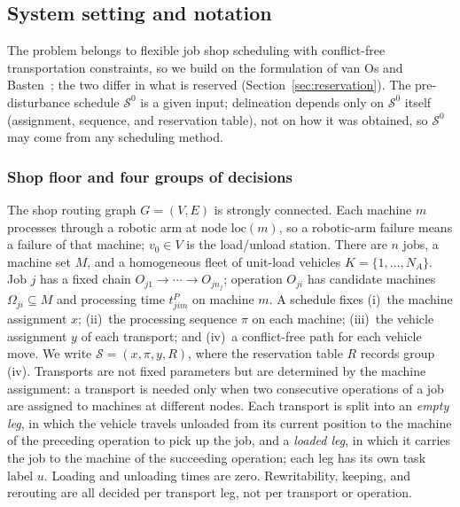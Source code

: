 \documentclass[manuscript,screen,review]{acmart}
\begin{document}
\subsection{System setting and notation}
\label{sec:system_brief}

The problem belongs to flexible job shop scheduling with conflict-free transportation constraints, so we build on the formulation of van Os and Basten~\cite{vanos2026exact}; the two differ in what is reserved (Section~\ref{sec:reservation}).
The pre-disturbance schedule \(\mathcal{S}^0\) is a given input; delineation depends only on \(\mathcal{S}^0\) itself (assignment, sequence, and reservation table), not on how it was obtained, so \(\mathcal{S}^0\) may come from any scheduling method.

\subsubsection{Shop floor and four groups of decisions}
\label{sec:shop}

The shop routing graph \(G=(V,E)\) is strongly connected. Each machine \(m\) processes through a robotic arm at node \(\mathrm{loc}(m)\), so a robotic-arm failure means a failure of that machine;
\(v_0\in V\) is the load/unload station. There are \(n\) jobs, a machine set \(M\), and a homogeneous fleet of unit-load vehicles \(K=\{1,\ldots,N_A\}\).
Job \(j\) has a fixed chain \(O_{j1}\to\cdots\to O_{jn_j}\); operation \(O_{ji}\) has candidate machines \(\Omega_{ji}\subseteq M\) and processing time \(t^P_{jim}\) on machine \(m\).
A schedule fixes (i)~the machine assignment \(x\); (ii)~the processing sequence \(\pi\) on each machine; (iii)~the vehicle assignment \(y\) of each transport; and (iv)~a conflict-free path for each vehicle move.
We write \(\mathcal{S}=(x,\pi,y,R)\), where the reservation table \(R\) records group (iv).
Transports are not fixed parameters but are determined by the machine assignment: a transport is needed only when two consecutive operations of a job are assigned to machines at different nodes.
Each transport is split into an \emph{empty leg}, in which the vehicle travels unloaded from its current position to the machine of the preceding operation to pick up the job, and a \emph{loaded leg}, in which it carries the job to the machine of the succeeding operation; each leg has its own task label \(u\).
Loading and unloading times are zero. Rewritability, keeping, and rerouting are all decided per transport leg, not per transport or operation.
\end{document}
